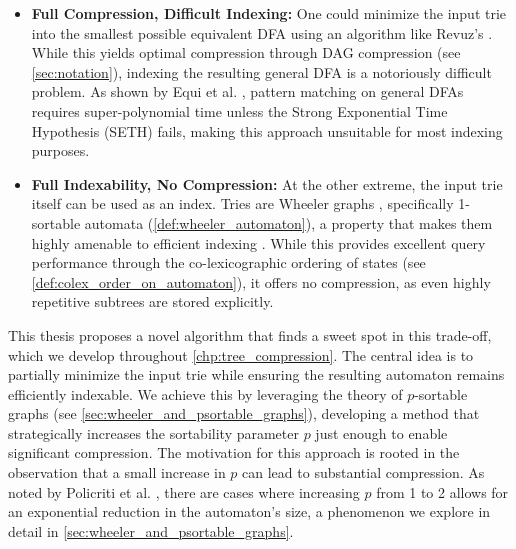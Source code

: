 \begin{itemize}
    \item \textbf{Full Compression, Difficult Indexing:} One could minimize the input trie into the smallest possible equivalent DFA using an algorithm like Revuz's \cite{revuz1992minimisation}. While this yields optimal compression through DAG compression (see \cref{sec:notation}), indexing the resulting general DFA is a notoriously difficult problem. As shown by Equi et al. \cite{equiGraphsCannotBe2023}, pattern matching on general DFAs requires super-polynomial time unless the Strong Exponential Time Hypothesis (SETH) fails, making this approach unsuitable for most indexing purposes.
    
    \item \textbf{Full Indexability, No Compression:} At the other extreme, the input trie itself can be used as an index. Tries are Wheeler graphs \cite{gagie2017wheeler}, specifically 1-sortable automata (\cref{def:wheeler_automaton}), a property that makes them highly amenable to efficient indexing \cite{cotumaccio2023co}. While this provides excellent query performance through the co-lexicographic ordering of states (see \cref{def:colex_order_on_automaton}), it offers no compression, as even highly repetitive subtrees are stored explicitly.
\end{itemize}

This thesis proposes a novel algorithm that finds a sweet spot in this trade-off, which we develop throughout \cref{chp:tree_compression}. The central idea is to partially minimize the input trie while ensuring the resulting automaton remains efficiently indexable. We achieve this by leveraging the theory of $p$-sortable graphs (see \cref{sec:wheeler_and_psortable_graphs}), developing a method that strategically increases the sortability parameter $p$ just enough to enable significant compression. The motivation for this approach is rooted in the observation that a small increase in $p$ can lead to substantial compression. As noted by Policriti et al. \cite{manziniRationalConstructionWheeler2024}, there are cases where increasing $p$ from 1 to 2 allows for an exponential reduction in the automaton's size, a phenomenon we explore in detail in \cref{sec:wheeler_and_psortable_graphs}.

